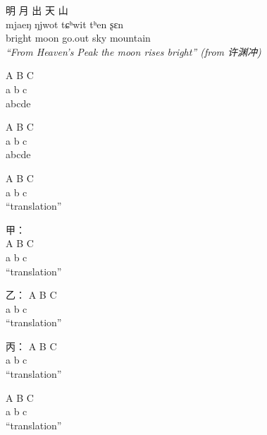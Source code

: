 \documentclass{article}
\newcommand{\ipa}[1]{{\fontspec{Charis SIL}#1}}
\begin{document}
\begin{exe}
  \let\eachwordone=\bf
  \let\eachwordtwo=\ipa
  \let\eachwordthree=\textit
  \glll 明 月 出 天 山\\ %
  mjaeŋ ŋjwot tɕʰwit tʰen ʂɛn\\ %
  bright moon go.out sky mountain\\ %
  \glt \textit{``From Heaven's Peak the moon rises bright'' (from 许渊冲)} %
\end{exe}

\begin{exe}
  \ex
  \begin{xlist}
      \ex 
      \gll
      A B C\\
      a b c\\
      \glt abcde

      \ex 
      \gll
      A B C\\
      a b c\\
      \glt abcde
  \end{xlist}
\end{exe}

\begin{exe}
  \gll A B C\\
  a b c\\
  \glt ``translation''

  \ex{}
  \glll 甲：\\
  A B C\\
  a b c\\
  \glt ``translation''

  \sn 乙：
  \gll A B C\\
  a b c\\
  \glt ``translation''

  \exi{} 丙： %
  \gll A B C\\
  a b c\\
  \glt ``translation'' 

  \gll A B C\\
  a b c\\
  \glt ``translation'' 
\end{exe}
\end{document}

